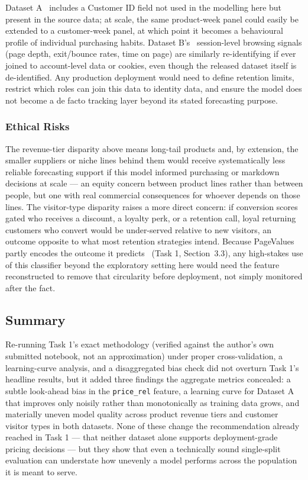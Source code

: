 Dataset A~\cite{chen2019onlineretailii} includes a Customer ID field not used in the modelling here
but present in the source data; at scale, the same product-week panel could easily be extended to
a customer-week panel, at which point it becomes a behavioural profile of individual purchasing
habits. Dataset B's~\cite{sakar2018shoppers} session-level browsing signals (page depth, exit/bounce
rates, time on page) are similarly re-identifying if ever joined to account-level data or cookies,
even though the released dataset itself is de-identified. Any production deployment would need to
define retention limits, restrict which roles can join this data to identity data, and ensure the
model does not become a de facto tracking layer beyond its stated forecasting purpose.

\subsubsection*{Ethical Risks}

The revenue-tier disparity above means long-tail products and, by extension, the smaller suppliers
or niche lines behind them would receive systematically less reliable forecasting support if this
model informed purchasing or markdown decisions at scale --- an equity concern between product
lines rather than between people, but one with real commercial consequences for whoever depends on
those lines. The visitor-type disparity raises a more direct concern: if conversion scores gated
who receives a discount, a loyalty perk, or a retention call, loyal returning customers who convert
would be under-served relative to new visitors, an outcome opposite to what most retention
strategies intend. Because PageValues partly encodes the outcome it
predicts~\cite{sakar2019realtime} (Task 1, Section~3.3), any high-stakes use of this classifier
beyond the exploratory setting here would need the feature reconstructed to remove that
circularity before deployment, not simply monitored after the fact.

\subsection{Summary}

Re-running Task 1's exact methodology (verified against the author's own submitted notebook, not
an approximation) under proper cross-validation, a learning-curve analysis, and a disaggregated
bias check did not overturn Task 1's headline results, but it added three findings the aggregate
metrics concealed: a subtle look-ahead bias in the \texttt{price\_rel} feature, a learning curve
for Dataset A that improves only noisily rather than monotonically as training data grows, and
materially uneven model quality across product revenue tiers and customer visitor types in both
datasets. None of these change the recommendation already reached in Task 1 --- that neither
dataset alone supports deployment-grade pricing decisions --- but they show that even a
technically sound single-split evaluation can understate how unevenly a model performs across the
population it is meant to serve.
